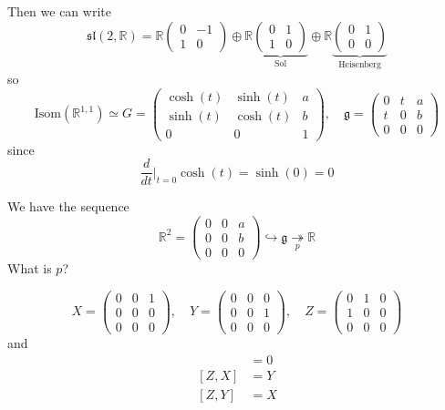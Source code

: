 \documentclass[12pt]{article}
\newcommand{\R}{\mathbb{R}}
\newcommand{\g}{\mathfrak{g}}
\renewcommand{\sl}{\mathfrak{sl}}
\newcommand{\Isom}{\text{Isom}}
\begin{document}
    Then we can write 
    \[\sl(2, \R) = \R\begin{pmatrix}
        0 & -1\\ 
        1 & 0
    \end{pmatrix} \oplus \R\underbrace{\begin{pmatrix}
        0 & 1\\ 
        1 & 0
    \end{pmatrix}}_{\text{Sol}} \oplus \R\underbrace{\begin{pmatrix}
        0 & 1\\ 
        0 & 0
    \end{pmatrix}}_{\text{Heisenberg}}\]
    so 
    \[\Isom(\R^{1, 1}) \simeq G =\left(\begin{array}{cc|c}
        \cosh(t) & \sinh(t) & a\\
        \sinh(t) & \cosh(t) & b\\ 
        \hline
        0 & 0 & 1
    \end{array}\right), \quad \g = \left(\begin{array}{cc|c}
        0 & t & a\\ 
        t & 0 & b\\
        \hline
        0 & 0 & 0        
    \end{array}\right)\] 
    since 
    \[\frac{d}{dt}\bigg\vert_{t=0} \cosh(t) = \sinh(0) = 0\] 

    We have the sequence 
    \[\R^2 = \begin{pmatrix}
        0 & 0 & a\\ 
        0 & 0 & b\\
        0 & 0 & 0
    \end{pmatrix} \hookrightarrow \g \underset{p}{\twoheadrightarrow} \R\]
    What is $p$? 

    \[X = \begin{pmatrix}
        0 & 0 & 1\\ 
        0 & 0 & 0\\ 
        0 & 0 & 0
    \end{pmatrix}, \quad Y = \begin{pmatrix}
        0 & 0 & 0\\ 
        0 & 0 & 1\\ 
        0 & 0 & 0
    \end{pmatrix}, \quad Z = \begin{pmatrix}
        0 & 1 & 0\\ 
        1 & 0 & 0\\ 
        0 & 0 & 0
    \end{pmatrix}\]
    and 
    \begin{align*}
        [X, Y] &= 0\\ 
        [Z, X] &= Y\\ 
        [Z, Y] &= X
    \end{align*}
\end{document}
